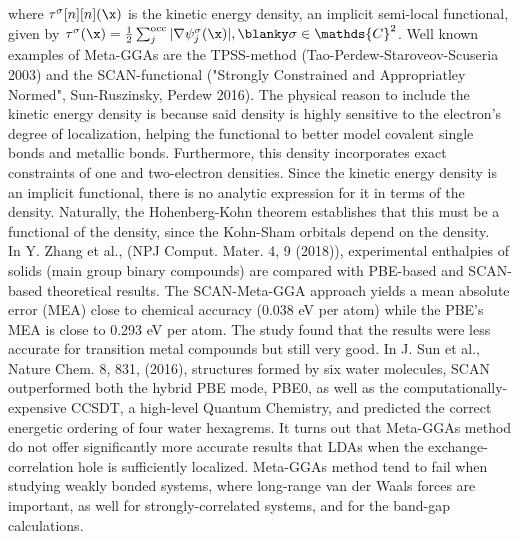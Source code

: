 \documentclass{homework}
\begin{document}
where $\tau^\sigma[n][n](\x)$ is the kinetic energy density, an implicit semi-local functional, given by $\tau^\sigma(\x) = \frac{1}{2} \sum_{j}^{\textnormal{occ}} |\nabla\psi_j^\sigma (\x)|, \blanky \sigma \in \mathds{C}^2$. Well known examples of Meta-GGAs are the TPSS-method (Tao-Perdew-Staroveov-Scuseria 2003) and the SCAN-functional ("Strongly Constrained and Appropriatley Normed", Sun-Ruszinsky, Perdew 2016). The physical reason to include the kinetic energy density is because said density is highly sensitive to the electron's degree of localization, helping the functional to better model covalent single bonds and metallic bonds. Furthermore, this density incorporates exact constraints of one and two-electron densities. Since the kinetic energy density is an implicit functional, there is no analytic expression for it in terms of the density. Naturally, the Hohenberg-Kohn theorem establishes that this must be a functional of the density, since the Kohn-Sham orbitals depend on the density. \\

In Y. Zhang et al., (NPJ Comput. Mater. 4, 9 (2018)), experimental enthalpies of solids (main group binary compounds) are compared with PBE-based and SCAN-based theoretical results. The SCAN-Meta-GGA approach yields a mean absolute error (MEA) close to chemical accuracy (0.038 eV per atom) while the PBE's MEA is close to 0.293 eV per atom. The study found that the results were less accurate for transition metal compounds but still very good. In J. Sun et al., Nature Chem. 8, 831, (2016), structures formed by six water molecules, SCAN outperformed both the hybrid PBE mode, PBE0, as well as the computationally-expensive CCSDT, a high-level Quantum Chemistry, and predicted the correct energetic ordering of four water hexagrems. It turns out that Meta-GGAs method do not offer significantly more accurate results that LDAs when the exchange-correlation hole is sufficiently localized. Meta-GGAs method tend to fail when studying weakly bonded systems, where long-range van der Waals forces are important, as well for strongly-correlated systems, and for the band-gap calculations.
\end{document}
